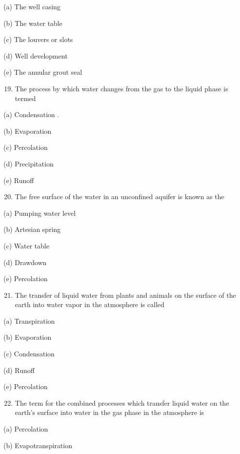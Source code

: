 \documentclass[10pt]{article}
\begin{document}
(a) The well casing

(b) The water table

(c) The louvers or slots

(d) Well development

(e) The annular grout seal

\begin{enumerate}
  \setcounter{enumi}{18}
  \item The process by which water changes from the gas to the liquid phase is termed
\end{enumerate}

(a) Condensation .

(b) Evaporation

(c) Percolation

(d) Precipitation

(e) Runoff

\begin{enumerate}
  \setcounter{enumi}{19}
  \item The free surface of the water in an unconfined aquifer is known as the
\end{enumerate}

(a) Pumping water level

(b) Artesian spring

(c) Water table

(d) Drawdown

(e) Percolation

\begin{enumerate}
  \setcounter{enumi}{20}
  \item The transfer of liquid water from plants and animals on the surface of the earth into water vapor in the atmosphere is called
\end{enumerate}

(a) Transpiration

(b) Evaporation

(c) Condensation

(d) Runoff

(e) Percolation

\begin{enumerate}
  \setcounter{enumi}{21}
  \item The term for the combined processes which transfer liquid water on the earth's surface into water in the gas phase in the atmosphere is
\end{enumerate}

(a) Percolation

(b) Evapotranspiration
\end{document}
